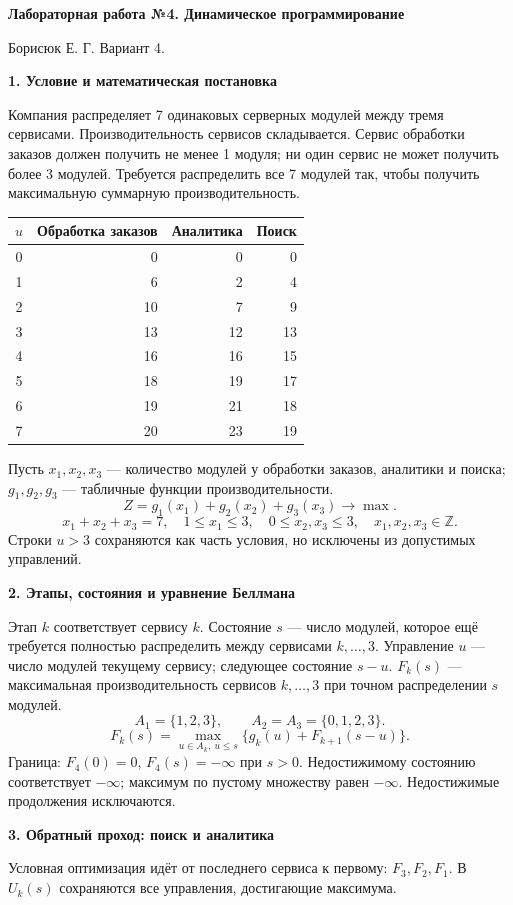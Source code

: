 \documentclass[12pt,a4paper]{article}
\newcommand{\head}[1]{\medskip\textbf{#1}\par}
\begin{document}
\begin{center}\large\textbf{Лабораторная работа №4. Динамическое программирование}\end{center}
Борисюк Е. Г. Вариант 4.

\head{1. Условие и математическая постановка}
Компания распределяет 7 одинаковых серверных модулей между тремя сервисами.
Производительность сервисов складывается. Сервис обработки заказов должен
получить не менее 1 модуля; ни один сервис не может получить более 3 модулей.
Требуется распределить все 7 модулей так, чтобы получить максимальную
суммарную производительность.

\begin{center}\begin{tabular}{c|r|r|r}
$u$ & Обработка заказов & Аналитика & Поиск\\\hline
0&0&0&0\\1&6&2&4\\2&10&7&9\\3&13&12&13\\
4&16&16&15\\5&18&19&17\\6&19&21&18\\7&20&23&19
\end{tabular}\end{center}
Пусть $x_1,x_2,x_3$ --- количество модулей у обработки заказов, аналитики
и поиска; $g_1,g_2,g_3$ --- табличные функции производительности.
\[Z=g_1(x_1)+g_2(x_2)+g_3(x_3)\longrightarrow\max.\]
\[x_1+x_2+x_3=7,\quad 1\le x_1\le3,\quad0\le x_2,x_3\le3,
\quad x_1,x_2,x_3\in\mathbb Z.\]
Строки $u>3$ сохраняются как часть условия, но исключены из допустимых управлений.

\head{2. Этапы, состояния и уравнение Беллмана}
Этап $k$ соответствует сервису $k$. Состояние $s$ --- число модулей,
которое ещё требуется полностью распределить между сервисами $k,\ldots,3$.
Управление $u$ --- число модулей текущему сервису; следующее состояние $s-u$.
$F_k(s)$ --- максимальная производительность сервисов $k,\ldots,3$
при точном распределении $s$ модулей.
\[A_1=\{1,2,3\},\qquad A_2=A_3=\{0,1,2,3\}.\]
\[F_k(s)=\max_{u\in A_k,\ u\le s}\{g_k(u)+F_{k+1}(s-u)\}.\]
Граница: $F_4(0)=0$, $F_4(s)=-\infty$ при $s>0$.
Недостижимому состоянию соответствует $-\infty$; максимум по пустому
множеству равен $-\infty$. Недостижимые продолжения исключаются.

\newpage
\head{3. Обратный проход: поиск и аналитика}
Условная оптимизация идёт от последнего сервиса к первому: $F_3,F_2,F_1$.
В $U_k(s)$ сохраняются все управления, достигающие максимума.
\end{document}
